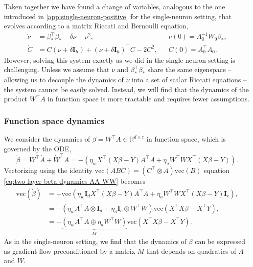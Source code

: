 \documentclass{article}
\theoremstyle{plain}
\theoremstyle{definition}
\theoremstyle{remark}
\begin{document}
Taken together we have found a change of variables, analogous to the one introduced in \cref{app:single-neuron-positive} for the single-neuron setting, that evolves according to a matrix Riccati and Bernoulli equation,
\begin{align}
    \dot{\nu} &= \beta_*^\intercal\beta_* - \delta \nu - \nu^2, && \nu(0) = A_0^{-1}W_0\beta_*,\\
    \dot{C} &= C (\nu + \delta \mathbf{I}_h) + (\nu + \delta \mathbf{I}_h)^\intercal C - 2C^2, && C(0) = A_0^\intercal A_0.
\end{align}
However, solving this system exactly as we did in the single-neuron setting is challenging. Unless we assume that $\nu$ and $\beta_*^\intercal\beta_*$ share the same eigenspace -- allowing us to decouple the dynamics of $\nu$ into a set of scalar Riccati equations -- the system cannot be easily solved.
%
Instead, we will find that the dynamics of the product $W^\intercal A$ in function space is more tractable and requires fewer assumptions.

\subsubsection{Function space dynamics}
%
We consider the dynamics of $\beta = W^\intercal A \in \mathbb{R}^{d \times c}$ in function space, which is governed by the ODE,
\begin{equation}
\label{eq:two-layer-beta-dynamics-AA-WW}
    \dot{\beta}=W^{\intercal}\dot{A} + \dot{W}^{\intercal}A = -\left(\eta_w X^\intercal(X \beta -Y)A^{\intercal}A + \eta_a W^{\intercal}W X^{\intercal}  (X\beta -Y)\right).
\end{equation}
%
Vectorizing using the identity  $ \mathrm{vec}(ABC) = ( C^{\intercal}\otimes A ) \mathrm{vec}(B)$ equation \ref{eq:two-layer-beta-dynamics-AA-WW} becomes
 \begin{align}
    \mathrm{vec}\left(\dot{\beta}\right) &= - \mathrm{vec} \left ( \eta_w \mathbf{I}_d X^\intercal(X \beta -Y)A^{\intercal}A  +  \eta_a W^{\intercal}W X^{\intercal} (X \beta -Y)\mathbf{I}_c \right ),\\
    &=  -( \eta_w A^{\intercal}A \otimes  \mathbf{I}_d  +  \eta_a \mathbf{I}_c \otimes W^{\intercal}W  )\mathrm{vec}(X^\intercal X\beta - X^\intercal Y),\\
    \label{eq:vect_beta}
    & =  -  \underbrace{\left(\eta_w A^{\intercal}A \oplus \eta_a W^{\intercal}W\right)}_{M} \mathrm{vec}(X^\intercal X\beta - X^\intercal Y).
\end{align}
As in the single-neuron setting, we find that the dynamics of $\beta$ can be expressed as gradient flow preconditioned by a matrix $M$ that depends on quadratics of $A$ and $W$.
\end{document}
